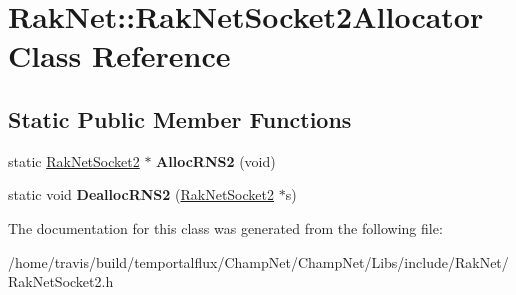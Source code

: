 \hypertarget{class_rak_net_1_1_rak_net_socket2_allocator}{\section{Rak\-Net\-:\-:Rak\-Net\-Socket2\-Allocator Class Reference}
\label{class_rak_net_1_1_rak_net_socket2_allocator}
}
\subsection*{Static Public Member Functions}
\begin{DoxyCompactItemize}
\item 
\hypertarget{class_rak_net_1_1_rak_net_socket2_allocator_a93e4b94e4b91ba758e17a2d24ffa9d8c}{static \hyperlink{class_rak_net_1_1_rak_net_socket2}{Rak\-Net\-Socket2} $\ast$ {\bfseries Alloc\-R\-N\-S2} (void)}\label{class_rak_net_1_1_rak_net_socket2_allocator_a93e4b94e4b91ba758e17a2d24ffa9d8c}

\item 
\hypertarget{class_rak_net_1_1_rak_net_socket2_allocator_a044b1fc7306d2de065e42c458da15e82}{static void {\bfseries Dealloc\-R\-N\-S2} (\hyperlink{class_rak_net_1_1_rak_net_socket2}{Rak\-Net\-Socket2} $\ast$s)}\label{class_rak_net_1_1_rak_net_socket2_allocator_a044b1fc7306d2de065e42c458da15e82}

\end{DoxyCompactItemize}


The documentation for this class was generated from the following file\-:\begin{DoxyCompactItemize}
\item 
/home/travis/build/temportalflux/\-Champ\-Net/\-Champ\-Net/\-Libs/include/\-Rak\-Net/Rak\-Net\-Socket2.\-h\end{DoxyCompactItemize}
